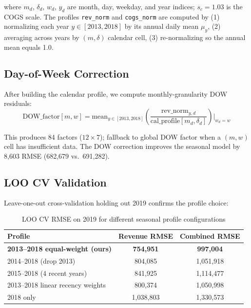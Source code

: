 \documentclass{article}
\begin{document}
where $m_d$, $\delta_d$, $w_d$, $y_d$ are month, day, weekday, and year indices; $s_c = 1.03$ is the COGS scale.
The profiles \texttt{rev\_norm} and \texttt{cogs\_norm} are computed by (1) normalizing each year $y \in [2013, 2018]$ by its annual daily mean $\mu_y$, (2) averaging across years by $(m, \delta)$ calendar cell, (3) re-normalizing so the annual mean equals 1.0.

\subsection{Day-of-Week Correction}

After building the calendar profile, we compute monthly-granularity DOW residuals:
\begin{equation}
\text{DOW\_factor}[m, w] = \text{mean}_{y \in [2013,2018]}\left(\frac{\text{rev\_norm}_{y,d}}{\text{cal\_profile}[m_d, \delta_d]}\right) \Bigg|_{w_d = w}
\end{equation}

This produces 84 factors ($12 \times 7$); fallback to global DOW factor when a $(m, w)$ cell has insufficient data.
The DOW correction improves the seasonal model by 8{,}603 RMSE (682{,}679 vs.\ 691{,}282).

\subsection{LOO CV Validation}

Leave-one-out cross-validation holding out 2019 confirms the profile choice:

\begin{table}[H]
\centering
\caption{LOO CV RMSE on 2019 for different seasonal profile configurations}
\label{tab:loo}
\small
\begin{tabular}{lcc}
\toprule
Profile & Revenue RMSE & Combined RMSE \\
\midrule
\textbf{2013--2018 equal-weight (ours)} & \textbf{754,951} & \textbf{997,004} \\
2014--2018 (drop 2013) & 804,085 & 1,051,918 \\
2015--2018 (4 recent years) & 841,925 & 1,114,477 \\
2013--2018 linear recency weights & 800,374 & 1,050,998 \\
2018 only & 1,038,803 & 1,330,573 \\
\bottomrule
\end{tabular}
\end{table}
\end{document}
